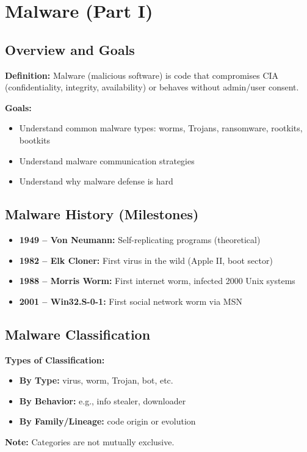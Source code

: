  \section{Malware (Part I)}

\subsection{Overview and Goals}
{
\textbf{Definition:} Malware (malicious software) is code that compromises CIA (confidentiality, integrity, availability) or behaves without admin/user consent.

\textbf{Goals:}
\begin{itemize}[noitemsep]
  \item Understand common malware types: worms, Trojans, ransomware, rootkits, bootkits
  \item Understand malware communication strategies
  \item Understand why malware defense is hard
\end{itemize}
}

\subsection{Malware History (Milestones)}
{
\begin{itemize}[noitemsep]
  \item \textbf{1949 – Von Neumann:} Self-replicating programs (theoretical)
  \item \textbf{1982 – Elk Cloner:} First virus in the wild (Apple II, boot sector)
  \item \textbf{1988 – Morris Worm:} First internet worm, infected 2000 Unix systems
  \item \textbf{2001 – Win32.S-0-1:} First social network worm via MSN
\end{itemize}
}

\subsection{Malware Classification}
{
\textbf{Types of Classification:}
\begin{itemize}[noitemsep]
  \item \textbf{By Type:} virus, worm, Trojan, bot, etc.
  \item \textbf{By Behavior:} e.g., info stealer, downloader
  \item \textbf{By Family/Lineage:} code origin or evolution
\end{itemize}

\textbf{Note:} Categories are not mutually exclusive.
}

